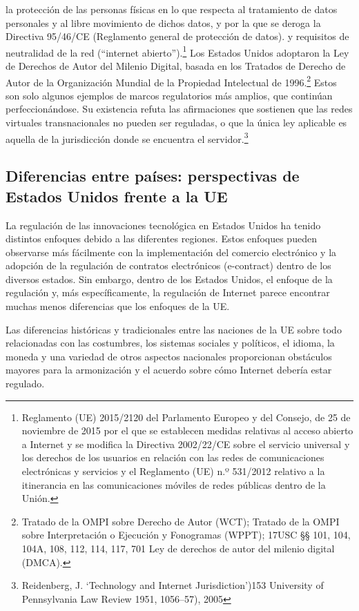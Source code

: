 \documentclass[12pt]{report} %
\begin{document}
{la protección de las personas físicas en lo que respecta al tratamiento de datos personales y al libre
movimiento de dichos datos, y por la que se deroga la Directiva 95/46/CE (Reglamento general de protección de datos). 
}  y requisitos de neutralidad de la red (“internet abierto”).\footnote{Reglamento (UE) 2015/2120 del Parlamento Europeo y del Consejo, de 25 de noviembre
de 2015 por el que se establecen medidas relativas al acceso abierto a Internet y se modifica la Directiva 2002/22/CE sobre el servicio universal y los derechos de los usuarios en relación con las redes de comunicaciones electrónicas y servicios y el Reglamento (UE) n.º 531/2012 relativo a la itinerancia en las comunicaciones móviles de redes públicas dentro de la Unión.
}  Los Estados Unidos adoptaron la Ley de Derechos de Autor del Milenio Digital, basada en los Tratados de Derecho de Autor de la Organización Mundial de la Propiedad Intelectual de 1996.\footnote{Tratado de la OMPI sobre Derecho de Autor (WCT); Tratado de la OMPI sobre Interpretación o Ejecución y Fonogramas (WPPT); 17USC §§ 101, 104, 104A, 108, 112, 114, 117, 701 Ley de derechos de autor del milenio digital (DMCA).}  Estos son solo algunos ejemplos de marcos regulatorios más amplios, que continúan perfeccionándose. Su existencia refuta las afirmaciones que sostienen que las redes virtuales transnacionales no pueden ser reguladas, o que la única ley aplicable es aquella de la jurisdicción donde se encuentra el servidor.\footnote{Reidenberg, J. ‘Technology and Internet Jurisdiction’)153 University of Pennsylvania Law Review 1951, 1056–57), 2005}  

\subsection{Diferencias entre países: perspectivas de Estados Unidos frente a la UE}

La regulación de las innovaciones tecnológica en Estados Unidos ha tenido distintos enfoques debido a las diferentes regiones. Estos enfoques pueden observarse más fácilmente con la implementación del comercio electrónico y la adopción de la regulación de contratos electrónicos (e-contract) dentro de los diversos estados. Sin embargo, dentro de los Estados Unidos, el enfoque de la regulación y, más específicamente, la regulación de Internet parece encontrar muchas menos diferencias que los enfoques de la UE. 

Las diferencias históricas y tradicionales entre las naciones de la UE sobre todo relacionadas con las costumbres, los sistemas sociales y políticos, el idioma, la moneda y una variedad de otros aspectos nacionales  proporcionan obstáculos mayores para la armonización y el acuerdo sobre cómo Internet debería estar regulado.
\end{document}
